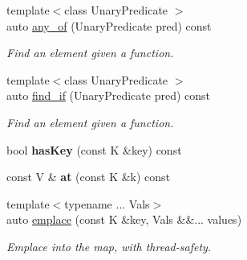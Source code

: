 \begin{Indent}
\begin{DoxyCompactItemize}
{\footnotesize template$<$class Unary\+Predicate $>$ }\\auto \mbox{\hyperlink{classrev_1_1_threaded_map_a00cb8a67b38b0f654c7a5833e82f3c71}{any\+\_\+of}} (Unary\+Predicate pred) const
\begin{DoxyCompactList}\small\item\em Find an element given a function. \end{DoxyCompactList}\item 
\mbox{\label{classrev_1_1_threaded_map_a072175163c509b9f9d9eba4e1dfc2aa0}} 
{\footnotesize template$<$class Unary\+Predicate $>$ }\\auto \mbox{\hyperlink{classrev_1_1_threaded_map_a072175163c509b9f9d9eba4e1dfc2aa0}{find\+\_\+if}} (Unary\+Predicate pred) const
\begin{DoxyCompactList}\small\item\em Find an element given a function. \end{DoxyCompactList}\item 
\mbox{\label{classrev_1_1_threaded_map_a91a9b93a055d539be36cbd751fe68407}} 
bool {\bfseries has\+Key} (const K \&key) const
\item 
\mbox{\label{classrev_1_1_threaded_map_a3a0f5883b3b970a2b6fe0a023f462e12}} 
const V \& {\bfseries at} (const K \&k) const
\item 
\mbox{\label{classrev_1_1_threaded_map_a50331fbac17063b5aad660408e48088b}} 
{\footnotesize template$<$typename ... Vals$>$ }\\auto \mbox{\hyperlink{classrev_1_1_threaded_map_a50331fbac17063b5aad660408e48088b}{emplace}} (const K \&key, Vals \&\&... values)
\begin{DoxyCompactList}\small\item\em Emplace into the map, with thread-\/safety. \end{DoxyCompactList}\end{DoxyCompactItemize}
\end{Indent}
